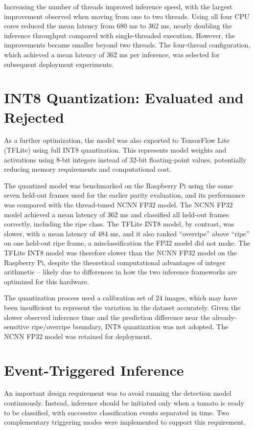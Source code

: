 \documentclass[12pt,a4paper]{report}
\begin{document}
Increasing the number of threads improved inference speed, with the largest improvement observed when moving from one to two threads. Using all four CPU cores reduced the mean latency from 680 ms to 362 ms, nearly doubling the inference throughput compared with single-threaded execution. However, the improvements became smaller beyond two threads. The four-thread configuration, which achieved a mean latency of 362 ms per inference, was selected for subsequent deployment experiments.

\section{INT8 Quantization: Evaluated and Rejected}

As a further optimization, the model was also exported to TensorFlow Lite (TFLite) using full INT8 quantization. This represents model weights and activations using 8-bit integers instead of 32-bit floating-point values, potentially reducing memory requirements and computational cost.

The quantized model was benchmarked on the Raspberry Pi using the same seven held-out frames used for the earlier parity evaluation, and its performance was compared with the thread-tuned NCNN FP32 model. The NCNN FP32 model achieved a mean latency of 362 ms and classified all held-out frames correctly, including the ripe class. The TFLite INT8 model, by contrast, was slower, with a mean latency of 484 ms, and it also ranked ``overripe'' above ``ripe'' on one held-out ripe frame, a misclassification the FP32 model did not make. The TFLite INT8 model was therefore slower than the NCNN FP32 model on the Raspberry Pi, despite the theoretical computational advantages of integer arithmetic -- likely due to differences in how the two inference frameworks are optimized for this hardware.

The quantization process used a calibration set of 24 images, which may have been insufficient to represent the variation in the dataset accurately. Given the slower observed inference time and the prediction difference near the already-sensitive ripe/overripe boundary, INT8 quantization was not adopted. The NCNN FP32 model was retained for deployment.

\section{Event-Triggered Inference}

An important design requirement was to avoid running the detection model continuously. Instead, inference should be initiated only when a tomato is ready to be classified, with successive classification events separated in time. Two complementary triggering modes were implemented to support this requirement.
\end{document}
